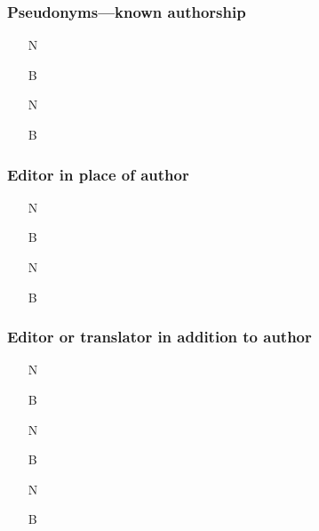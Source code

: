 \documentclass[11pt,letterpaper,oneside]{article}
\begin{document}


\setcounter{subsubsection}{81}
\subsubsection{Pseudonyms---known authorship}
\label{14.82}

\begin{itemize}
\item[N] 

\item[B] 

\item[N] 

\item[B] 
\end{itemize}

\setcounter{subsubsection}{86}
\subsubsection{Editor in place of author}
\label{14.87}

\begin{itemize}
\item[N] 

\item[B] 

\item[N] 

\item[B] 
\end{itemize}

\subsubsection{Editor or translator in addition to author}
\label{14.88}

\begin{itemize}
\item[N] 

\item[B] 

\item[N] 

\item[B] 

\item[N] 

\item[B] 
\end{itemize}
\end{document}
